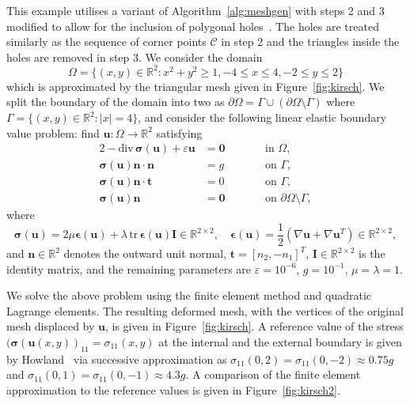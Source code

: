 \documentclass[11pt]{article}
\begin{document}
This example utilises a variant of Algorithm~\ref{alg:meshgen} with steps 2 and 3
modified to allow for the inclusion of polygonal holes~\cite{adaptmesh2020}.
The holes are treated similarly as the sequence of corner points $\mathcal{C}$ in step 2
and the triangles inside the holes are removed in step 3.
We consider the domain
\[
\Omega = \{ (x, y) \in \mathbb{R}^2 : x^2 + y^2 \geq 1, -4 \leq x \leq 4,-2 \leq y \leq 2\}
\]
which is approximated by the triangular mesh given in Figure~\ref{fig:kirsch}.
We split the boundary of the domain into two as $\partial \Omega = \Gamma \cup (\partial \Omega \setminus \Gamma)$
where $\Gamma = \{ (x, y) \in \mathbb{R}^2 : |x|=4 \}$, and
consider the following linear elastic boundary value problem: find $\boldsymbol{u} : \Omega \rightarrow \mathbb{R}^2$ satisfying
\begin{alignat}{2}
  -\mathrm{div}\,\boldsymbol{\sigma}(\boldsymbol{u}) + \varepsilon \boldsymbol{u} &= \boldsymbol{0} \qquad &&\text{in $\Omega$},\\
  \boldsymbol{\sigma}(\boldsymbol{u})\boldsymbol{n} \cdot \boldsymbol{n} &= g \qquad &&\text{on $\Gamma$},\\
  \boldsymbol{\sigma}(\boldsymbol{u})\boldsymbol{n} \cdot \boldsymbol{t} &= 0 \qquad &&\text{on $\Gamma$},\\
  \boldsymbol{\sigma}(\boldsymbol{u})\boldsymbol{n} &= \boldsymbol{0} \qquad &&\text{on $\partial \Omega \setminus \Gamma$},
\end{alignat}
where
\[
\boldsymbol{\sigma}(\boldsymbol{u}) = 2 \mu \boldsymbol{\epsilon}(\boldsymbol{u}) + \lambda \,\mathrm{tr}\,\boldsymbol{\epsilon}(\boldsymbol{u}) \boldsymbol{I} \in \mathbb{R}^{2 \times 2}, \quad \boldsymbol{\epsilon}(\boldsymbol{u}) = \frac12\left(\nabla \boldsymbol{u} + \nabla \boldsymbol{u}^T\right) \in \mathbb{R}^{2 \times 2},
\]
and
$\boldsymbol{n} \in \mathbb{R}^2$ denotes the outward unit normal, $\boldsymbol{t} = [n_2, -n_1]^T$,
$\boldsymbol{I} \in \mathbb{R}^{2 \times 2}$ is the identity matrix,
and the remaining parameters are $\varepsilon = 10^{-6}$, $g = 10^{-1}$, $\mu = \lambda = 1$.

We solve the above problem using the finite element method and quadratic
Lagrange elements.  The resulting deformed mesh, with the vertices of the original mesh displaced by $\boldsymbol{u}$,
is given in Figure~\ref{fig:kirsch}.
A reference value of the stress $(\boldsymbol{\sigma}(\boldsymbol{u}(x, y))_{11} = \sigma_{11}(x, y)$
at the internal and the external boundary
is given by \mbox{Howland~\cite{howland1930stresses}}
via successive approximation as $\sigma_{11}(0, 2) = \sigma_{11}(0, -2) \approx 0.75 g$ and
$\sigma_{11}(0, 1) = \sigma_{11}(0, -1) \approx 4.3 g$.
A comparison of the finite element approximation to the reference values
is given in Figure~\ref{fig:kirsch2}.
\end{document}
